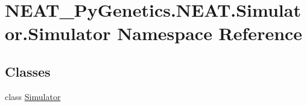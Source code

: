 \hypertarget{namespaceNEAT__PyGenetics_1_1NEAT_1_1Simulator_1_1Simulator}{}\section{N\+E\+A\+T\+\_\+\+Py\+Genetics.\+N\+E\+A\+T.\+Simulator.\+Simulator Namespace Reference}
\label{namespaceNEAT__PyGenetics_1_1NEAT_1_1Simulator_1_1Simulator}
\subsection*{Classes}
\begin{DoxyCompactItemize}
\item 
class \hyperlink{classNEAT__PyGenetics_1_1NEAT_1_1Simulator_1_1Simulator_1_1Simulator}{Simulator}
\end{DoxyCompactItemize}
